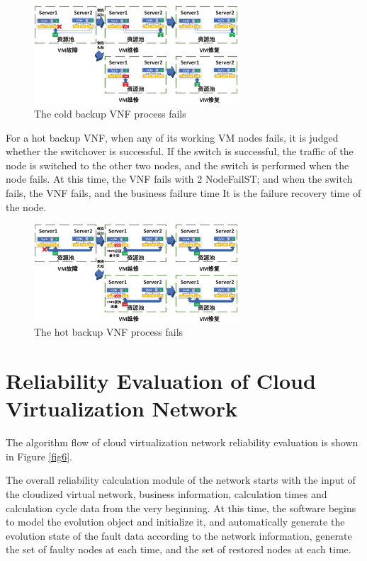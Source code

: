 \documentclass[journal]{IEEEtran}
\begin{document}
    \begin{figure}[!t]
        \begin{center}
            \includegraphics[width = 3in]{img/7.eps}
            \caption{The cold backup VNF process fails}
            \label{fig4}
        \end{center}
    \end{figure}

    For a hot backup VNF, when any of its working VM nodes fails, it is judged whether the switchover is successful. If the switch is successful, the traffic of the node is switched to the other two nodes, and the switch is performed when the node fails. At this time, the VNF fails with 2 NodeFailST; and when the switch fails, the VNF fails, and the business failure time It is the failure recovery time of the node.

    \begin{figure}[!t]
        \begin{center}
            \includegraphics[width = 3in]{img/8.eps}
            \caption{The hot backup VNF process fails}
            \label{fig5}
        \end{center}
    \end{figure}


    \section{Reliability Evaluation of Cloud Virtualization Network}
    The algorithm flow of cloud virtualization network reliability evaluation is shown in Figure \ref{fig6}.


    The overall reliability calculation module of the network starts with the input of the cloudized virtual network, business information, calculation times and calculation cycle data from the very beginning. At this time, the software begins to model the evolution object and initialize it, and automatically generate the evolution state of the fault data according to the network information, generate the set of faulty nodes at each time, and the set of restored nodes at each time.
\end{document}
